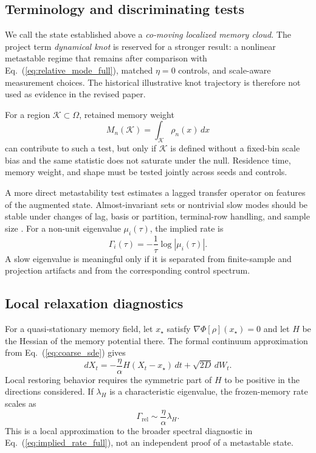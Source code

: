 \documentclass[reprint,amsmath,amssymb,aps,prd,nofootinbib,floatfix]{revtex4-2}
\begin{document}
\subsection{Terminology and discriminating tests}

We call the state established above a \emph{co-moving localized memory cloud}.
The project term \emph{dynamical knot} is reserved for a stronger result: a
nonlinear metastable regime that remains after comparison with
Eq.~(\ref{eq:relative_mode_full}), matched $\eta=0$ controls, and scale-aware
measurement choices.
The historical illustrative knot trajectory is therefore not used as evidence
in the revised paper.

For a region $\mathcal K\subset\Omega$, retained memory weight
\begin{equation}
M_n(\mathcal K)=\int_{\mathcal K}\rho_n(x)\,dx
\end{equation}
can contribute to such a test, but only if $\mathcal K$ is defined without a
fixed-bin scale bias and the same statistic does not saturate under the null.
Residence time, memory weight, and shape must be tested jointly across seeds
and controls.

A more direct metastability test estimates a lagged transfer operator on
features of the augmented state.
Almost-invariant sets or nontrivial slow modes should be stable under changes
of lag, basis or partition, terminal-row handling, and sample size
\cite{FroylandLloydSantitissadeekorn2010,NoeNuske2013,
NoeWuPrinzPlattner2013}.
For a non-unit eigenvalue $\mu_i(\tau)$, the implied rate is
\begin{equation}
\Gamma_i(\tau)=-\frac{1}{\tau}\log|\mu_i(\tau)|.
\label{eq:implied_rate_full}
\end{equation}
A slow eigenvalue is meaningful only if it is separated from finite-sample and
projection artifacts and from the corresponding control spectrum.

\subsection{Local relaxation diagnostics}

For a quasi-stationary memory field, let $x_\star$ satisfy
$\nabla\Phi[\rho](x_\star)=0$ and let $H$ be the Hessian of the memory
potential there.
The formal continuum approximation from Eq.~(\ref{eq:coarse_sde}) gives
\begin{equation}
dX_t=-\frac{\eta}{\alpha}H(X_t-x_\star)\,dt
     +\sqrt{2D}\,dW_t .
\label{eq:ou_full}
\end{equation}
Local restoring behavior requires the symmetric part of $H$ to be positive in
the directions considered.
If $\lambda_H$ is a characteristic eigenvalue, the frozen-memory rate scales
as
\begin{equation}
\Gamma_{\mathrm{rel}}\sim\frac{\eta}{\alpha}\lambda_H .
\end{equation}
This is a local approximation to the broader spectral diagnostic in
Eq.~(\ref{eq:implied_rate_full}), not an independent proof of a metastable
state.
\end{document}

